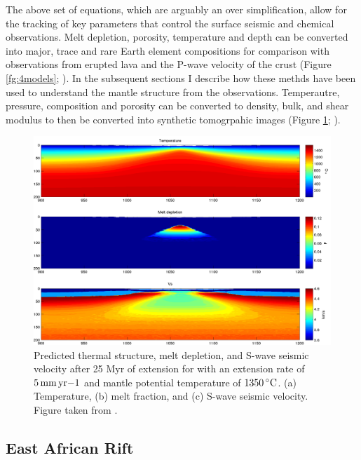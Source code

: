 The above set of equations, which are arguably an over simplification, allow for the tracking of key parameters that control the surface seismic and chemical observations. Melt depletion, porosity, temperature and depth can be converted into major, trace and rare Earth element compositions for comparison with observations from erupted lava and the P-wave velocity of the crust (Figure \ref{fg:4models}; \citealp{armitage-etal-2008,armitage-etal-2010,armitage-etal-epsl-2015,armitage-etal-g3-2018,armitage-etal-grl-2019}). In the subsequent sections I describe how these methds have been used to understand the mantle structure from the observations. Temperautre, pressure, composition and porosity can be converted to density, bulk, and shear modulus to then be converted into synthetic tomogrpahic images (Figure \ref{fg:mantleVs}; \citealp{goes-etal-2012,armitage-etal-eosl-2015,armitage-etal-g3-2018,armitage-etal-grl-2019}). 

\begin{figure}
\centering
\includegraphics[width=\textwidth]{./figures/ch2-mantleVs.pdf}
\caption{Predicted thermal structure, melt depletion, and S-wave seismic velocity after 25 Myr of extension for with an extension rate of $5\rm\,mm\,yr{-1}$ and mantle potential temperature of $1350\rm\,^{\circ}C$. (a) Temperature, (b) melt fraction, and (c) S-wave seismic velocity. Figure taken from \cite{armitage-etal-g3-2018}.}
\label{fg:mantleVs}
\end{figure}

\subsection{East African Rift}

